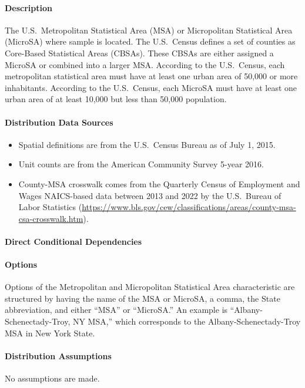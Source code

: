 \paragraph{Description}
% 
The U.S.~Metropolitan Statistical Area (MSA) or Micropolitan Statistical Area (MicroSA) where sample is located. The U.S.~Census defines a set of counties as Core-Based Statistical Areas (CBSAs). These CBSAs are either assigned a MicroSA or combined into a larger MSA. According to the U.S.~Census, each metropolitan statistical area must have at least one urban area of 50,000 or more inhabitants. According to the U.S.~Census, each MicroSA must have at least one urban area of at least 10,000 but less than 50,000 population.

\paragraph{Distribution Data Sources}
% 
\begin{itemize}

\item
  Spatial definitions are from the U.S.~Census Bureau as of July 1,
  2015.
\item
  Unit counts are from the American Community Survey 5-year 2016.
\item
  County-MSA crosswalk comes from the Quarterly Census of Employment and
  Wages NAICS-based data between 2013 and 2022 by the U.S.~Bureau of Labor
  Statistics
  (\url{https://www.bls.gov/cew/classifications/areas/county-msa-csa-crosswalk.htm}).
\end{itemize}

\paragraph{Direct Conditional Dependencies}


\paragraph{Options}
Options of the Metropolitan and Micropolitan Statistical Area characteristic are structured by having the name of the MSA or MicroSA, a comma, the State abbreviation, and either ``MSA'' or ``MicroSA.'' An example is ``Albany-Schenectady-Troy, NY MSA,'' which corresponds to the Albany-Schenectady-Troy MSA in New York State.

\paragraph{Distribution Assumptions}
% 
No assumptions are made.

